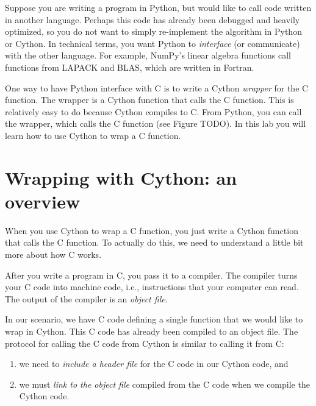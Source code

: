\newcommand{\of}{\texttt{.o}~}

\label{lab:cythonwrap}


Suppose you are writing a program in Python, but would like to call code written in another language.
Perhaps this code has already been debugged and heavily optimized, so you do not want to simply re-implement the algorithm in Python or Cython.
In technical terms, you want Python to \emph{interface} (or communicate) with the other language.
For example, NumPy's linear algebra functions call functions from LAPACK and BLAS, which are written in Fortran.

One way to have Python interface with C is to write a Cython \emph{wrapper} for the C function.
The wrapper is a Cython function that calls the C function. 
This is relatively easy to do because Cython compiles to C.
From Python, you can call the wrapper, which calls the C function (see Figure TODO).
In this lab you will learn how to use Cython to wrap a C function.

\section*{Wrapping with Cython: an overview}
When you use Cython to wrap a C function, you just write a Cython function that calls the C function.
To actually do this, we need to understand a little bit more about how C works.

After you write a program in C, you pass it to a compiler.
The compiler turns your C code into machine code, i.e., instructions that your computer can read.
The output of the compiler is an \emph{object file}.

In our scenario, we have C code defining a single function that we would like to wrap in Cython.
This C code has already been compiled to an object file.
The protocol for calling the C code from Cython is similar to calling it from C:
\begin{enumerate}
\item we need to \emph{include a header file} for the C code in our Cython code, and
\item we must \emph{link to the object file} compiled from the C code when we compile the Cython code.
\end{enumerate}

